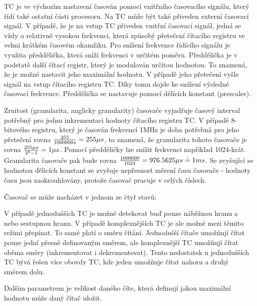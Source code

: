 
TC je ve výchozím nastavení časován pomocí vnitřního časovacího signálu, který řídí také ostatní části procesoru. Na TC může být také přiveden externí časovací signál. V případě, že je na vstup TC přiveden vnitřní časovací signál, jedná se vždy o relativně vysokou frekvenci, která způsobý přetečení čítacího registru ve velmi krátkém časovém okamžiku. Pro snížení frekvence řídícího signálu je využita předdělička, která sníží frekvenci v určitém poměru. Předdělička je v podstatě další čítací registr, který je modulován určitou hodnotou. To znamená, že je možné nastavit jeho maximální hodnotu. V případě jeho přetečení vyšle signál na vstup čítacího registru TC. Díky tomu dojde ke snížení výsledné časovací frekvence. Předdělička se nastavuje pomocí dělících konstant (prescaler).

Zrnitost (granularita, anglicky granularity) časovače vyjadřuje časový interval potřebný pro jednu inkrementaci hodnoty čítacího registru TC. V případě 8-bi\-to\-vého registru, který je časován frekvencí 1MHz je doba potřebná pro jeho přetečení rovna $ {255\over 1 000 000 s}= 255\mu s $, to znamená, že granularita tohoto časovače je rovna ${255\mu s \over {2^{8}-1}} =  1\mu s$. Pomocí předděličky lze snížit frekvenci například 1024-krát. Granularita časovače pak bude rovna ${1000 000\over 1024} = 976.5625 \mu s \doteq 1ms $. Se zvyšující se hodnotou dělicích konstant se zvyšuje nepřesnost měrení času časovače - hodnoty času jsou zaokrouhlovány, protože časovač pracuje v celých číslech.

Časovač se může nacházet v jednom ze čtyř stavů: 

\vskip 4mm
\vskip 4mm


V případě jednodušších TC je možné detekovat buď pouze náběžnou hranu a nebo sestupnou hranu. V případě komplexnějších TC je ale možné mezi těmito režimi přepínat. To samé platí o směru čítání. Jednodušší čítače umožňují čítat pouze jední přesně definovaným směrem, ale komplexnější TC umožňují čítat oběma směry (inkrementovat i dekrementovat). Tento nedostatek u jednodušších TC bývá řešen více obovdy TC, kde jeden umožňuje čítat nahoru a druhý směrem dolu. 

Dalším parametrem je velikost daného číte, která definují jakou maximální hodnotu může daný čítač uložit.

